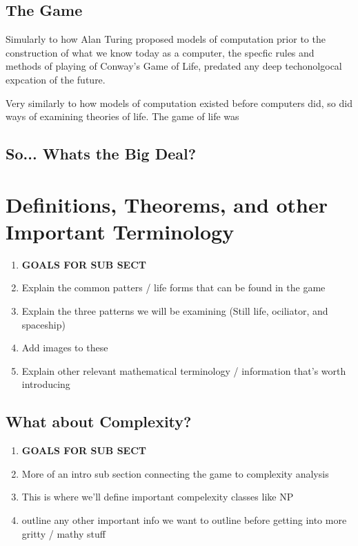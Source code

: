 \documentclass{article}
\theoremstyle{definition}
\theoremstyle{plain}
\theoremstyle{plain}
\begin{document}
\subsection{The Game}
Simularly to how Alan Turing proposed models of computation prior to the construction of what we know today as a computer, the specfic rules and methods of playing of Conway's Game of Life, predated any deep techonolgocal expcation of the future. 

Very similarly to how models of computation existed before computers did, so did ways of examining theories of life. The game of life was 

\subsection{So... Whats the Big Deal?}
\section{Definitions, Theorems, and other Important Terminology}
\begin{enumerate}
  \item[] \textbf{GOALS FOR SUB SECT}
  \item Explain the common patters / life forms that can be found in the game
  \item Explain the three patterns we will be examining (Still life, ociliator, and spaceship)
  \item Add images to these 
  \item Explain other relevant mathematical terminology / information that's worth introducing 

\end{enumerate}

\subsection{What about Complexity?}
\begin{enumerate}
  \item[] \textbf{GOALS FOR SUB SECT}
  \item More of an intro sub section connecting the game to complexity analysis  
  \item This is where we'll define important compelexity classes like NP
  \item outline any other important info we want to outline before getting into more gritty / mathy stuff

\end{enumerate}
\end{document}
